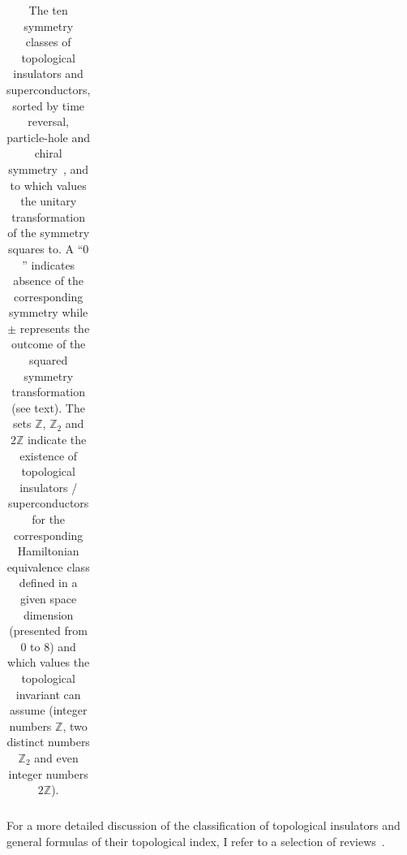 \begin{table}
\begin{tabular}{l | c c c | l l l l l l l l l}
        \hline\hline
    \end{tabular}
    \addtolength{\tabcolsep}{-0.25cm}
    \caption{The ten symmetry classes of topological insulators and superconductors, sorted by time reversal, particle-hole and chiral symmetry~\cite{Altland1997}, and to which values the unitary transformation of the symmetry squares to. A ``$0$'' indicates absence of the corresponding symmetry while $\pm$ represents the outcome of the squared symmetry transformation (see text). The sets $\mathds Z$, $\mathds Z_2$ and $2\mathds Z$ indicate the existence of topological insulators / superconductors for the corresponding Hamiltonian equivalence class defined in a given space dimension (presented from $0$ to $8$) and which values the topological invariant can assume (integer numbers $\mathds Z$, two distinct numbers $\mathds Z_2$ and even integer numbers $2\mathds Z$).}
    \label{tab:symmetry_classes}
\end{table}

For a more detailed discussion of the classification of topological insulators and general formulas of their topological index, I refer to a selection of reviews~\cite{Hasan2010,Chiu2016,Cooper2019}.
